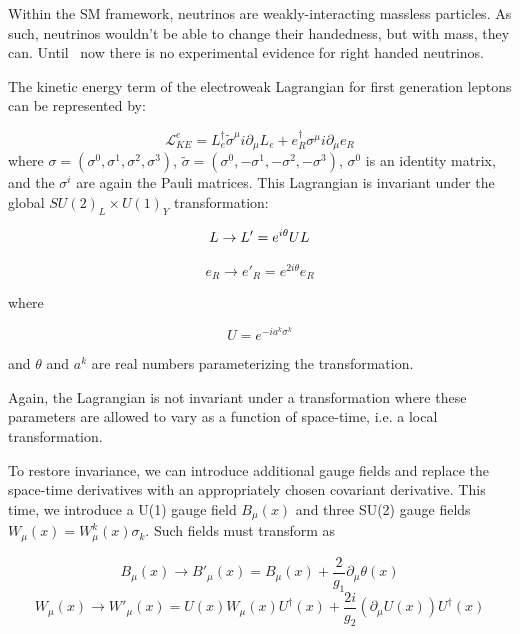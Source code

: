 Within the SM framework, neutrinos are weakly-interacting massless particles. As such, neutrinos wouldn't be able to change their handedness, but with mass, they can. Until \
now there is no experimental evidence for right handed neutrinos.

 The kinetic energy term of the electroweak Lagrangian for first generation leptons can be represented by:

 \begin{equation}
 \mathcal{L}_{KE}^{e} = L_{e}^{\dagger}\tilde{\sigma}^{\mu}i\partial_{\mu}L_{e}+ e_{R}^{\dagger}\sigma^{\mu}i\partial_{\mu}e_{R}
 \end{equation}
where $\sigma = (\sigma^{0}, \sigma^{1},\sigma^{2}, \sigma^{3})$, $\tilde{\sigma} = (\sigma^{0}, -\sigma^{1},-\sigma^{2}, -\sigma^{3})$, $\sigma^{0}$ is an identity matrix, and the $\sigma^{i}$ are again the Pauli matrices. This Lagrangian is invariant under the global $SU(2)_{L}\times U(1)_{Y}$ transformation:

\begin{equation}
L\rightarrow L' = e^{i\theta}UL\\
\end{equation}

\begin{equation}
e_{R}\rightarrow e'_{R} = e^{2i\theta}e_{R}
\end{equation}

where

\begin{equation}
U = e^{-ia^{k}\sigma^{k}}
\end{equation}

and $\theta$ and $a^{k}$ are real numbers parameterizing the transformation.

 Again, the Lagrangian is not invariant under a transformation where these parameters are allowed to vary as a function of space-time, i.e. a local transformation.

To restore invariance, we can introduce additional gauge fields and replace the space-time derivatives with an appropriately chosen covariant derivative. This time, we introduce a U(1) gauge field $B_{\mu}(x)$ and three SU(2) gauge fields $W_{\mu}(x)= W_{\mu}^{k}(x)\sigma_{k}$. Such fields must transform as

\begin{equation}
B_{\mu}(x)\rightarrow B'_{\mu}(x) = B_{\mu}(x) + \frac{2}{g_{1}}\partial_{\mu}\theta(x)
\end{equation}
\begin{equation}
W_{\mu}(x)\rightarrow W'_{\mu}(x) = U(x)W_{\mu}(x)U^{\dagger}(x) + \frac{2i}{g_{2}}(\partial_{\mu}U(x))U^{\dagger}(x)
\end{equation}

